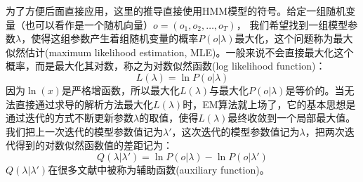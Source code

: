 \documentclass[11pt,a4paper]{article}
\numberwithin{equation}{section}
\begin{document}
为了方便后面直接应用，这里的推导直接使用HMM模型的符号。给定一组随机变量（也可以看作是一个随机向量）$ o = (o_1, o_2, \ldots, o_T) $， 我们希望找到一组模型参数$ \lambda $，使得这组参数产生着组随机变量的概率$ P(o | \lambda) $最大化，这个问题称为最大似然估计(maximum likelihood estimation, MLE)。一般来说不会直接最大化这个概率，而是最大化其对数，称之为对数似然函数(log likelihood function)：
\begin{equation}
L(\lambda) = \ln P(o | \lambda)
\end{equation}
因为$ \ln(x) $是严格增函数，所以最大化$ L(\lambda) $与最大化$ P(o | \lambda) $是等价的。当无法直接通过求导的解析方法最大化$ L(\lambda) $时，EM算法就上场了，它的基本思想是通过迭代的方式不断更新参数$ \lambda $的取值，使得$ L(\lambda) $最终收敛到一个局部最大值。我们把上一次迭代的模型参数值记为$ \lambda' $，这次迭代的模型参数值记为$ \lambda $，把两次迭代得到的对数似然函数值的差距记为：
\begin{equation}
Q(\lambda | \lambda') = \ln P(o | \lambda) - \ln P(o | \lambda')
\end{equation}
$ Q(\lambda | \lambda') $在很多文献中被称为辅助函数(auxiliary function)。
\end{document}
